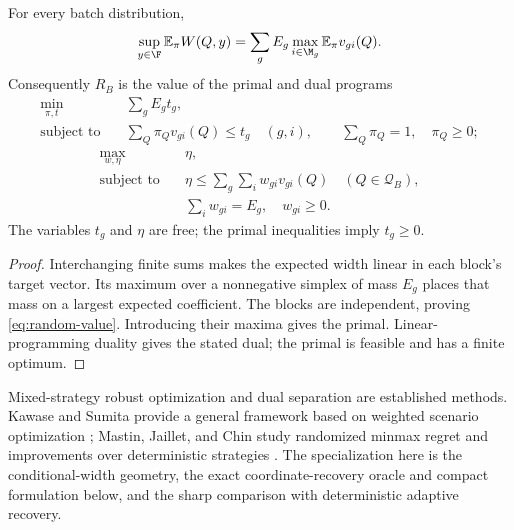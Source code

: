 \begin{proposition}
\label{prop:random-finite}
For every batch distribution,
\begin{equation}
 \sup_{y\in\F}\mathbb E_\pi W(Q,y)
 =\sum_g E_g\max_{i\in\M_g}\mathbb E_\pi v_{gi}(Q).
 \label{eq:random-value}
\end{equation}
Consequently $R_B$ is the value of the primal and dual programs
\begin{equation}
 \begin{aligned}
 \min_{\pi,t}\quad &\sum_g E_g t_g,\\
 \text{subject to}\quad
 &\sum_Q\pi_Qv_{gi}(Q)\leq t_g\quad(g,i),\qquad
   \sum_Q\pi_Q=1,\quad\pi_Q\geq0;
 \end{aligned}
 \label{eq:random-primal}
\end{equation}
\begin{equation}
 \begin{aligned}
 \max_{w,\eta}\quad &\eta,\\
 \text{subject to}\quad
 &\eta\leq\sum_g\sum_i w_{gi}v_{gi}(Q)\quad(Q\in\mathcal Q_B),\\
 &\sum_i w_{gi}=E_g,\quad w_{gi}\geq0.
 \end{aligned}
 \label{eq:random-dual}
\end{equation}
The variables $t_g$ and $\eta$ are free; the primal inequalities imply
$t_g\geq0$.
\end{proposition}
\begin{proof}
Interchanging finite sums makes the expected width linear in each
block's target vector. Its maximum over a nonnegative simplex of mass
$E_g$ places that mass on a largest expected coefficient. The blocks are
independent, proving \eqref{eq:random-value}. Introducing their maxima
gives the primal. Linear-programming duality gives the stated dual;
the primal is feasible and has a finite optimum.
\end{proof}

Mixed-strategy robust optimization and dual separation are established
methods. Kawase and Sumita provide a general framework based on weighted
scenario optimization \cite{kawase2024}; Mastin, Jaillet, and Chin study
randomized minmax regret and improvements over deterministic strategies
\cite{mastin2015}. The specialization here is the conditional-width
geometry, the exact coordinate-recovery oracle and compact formulation
below, and the sharp comparison with deterministic adaptive recovery.

